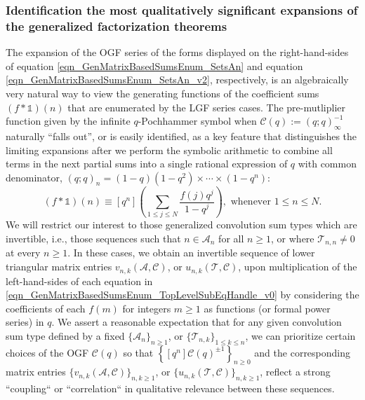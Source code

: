 \documentclass[12pt,reqno,a4letter]{article}
\numberwithin{figure}{section}
\numberwithin{table}{section}
\numberwithin{equation}{section}
\theoremstyle{plain}
\numberwithin{theorem}{section}
\theoremstyle{definition}
\begin{document}
\subsubsection{Identification the most qualitatively significant 
               expansions of the generalized factorization theorems}

The expansion of the OGF series of the forms displayed on the right-hand-sides of 
equation \eqref{eqn_GenMatrixBasedSumsEnum_SetsAn} and 
equation \eqref{eqn_GenMatrixBasedSumsEnum_SetsAn_v2}, respectively, 
is an algebraically very natural way to view the generating functions of the 
coefficient sums $(f \ast \mathds{1})(n)$ that are enumerated by the LGF series cases. 
The pre-mutliplier function given by the infinite $q$-Pochhammer symbol 
when $\mathcal{C}(q) := (q; q)_{\infty}^{-1}$ naturally ``falls out'', 
or is easily identified, as a key feature that distinguishes the limiting expansions 
after we perform the symbolic arithmetic to combine all terms 
in the next partial sums into a single rational expression of $q$ with common denominator, 
$(q; q)_n = (1-q)(1-q^2) \times \cdots \times (1-q^n)$: 
\[
(f \ast \mathds{1})(n) \equiv [q^n] \left(\sum_{1 \leq j \leq N} \frac{f(j) q^j}{1-q^j}\right), 
     \text{ whenever } 1 \leq n \leq N. 
\]
We will restrict our interest to those generalized convolution sum types which are invertible, 
i.e., those sequences such that $n \in \mathcal{A}_n$ for all $n \geq 1$, or where 
$\mathcal{T}_{n,n} \neq 0$ at every $n \geq 1$. 
In these cases, we obtain an invertible sequence of lower triangular matrix entries 
$v_{n,k}(\mathcal{A}, \mathcal{C})$, or $u_{n,k}(\mathcal{T}, \mathcal{C})$, upon 
multiplication of the left-hand-sides of each equation in 
\eqref{eqn_GenMatrixBasedSumsEnum_TopLevelSubEqHandle_v0} by 
considering the coefficients of each 
$f(m)$ for integers $m \geq 1$ as functions (or formal power series) in $q$. 
We assert a reasonable expectation 
that for any given convolution sum type defined by a fixed 
$\{\mathcal{A}_n\}_{n \geq 1}$, or $\{\mathcal{T}_{n,k}\}_{1 \leq k \leq n}$, 
we can prioritize certain choices of the OGF $\mathcal{C}(q)$ so that 
$\left\{[q^n] \mathcal{C}(q)^{\pm 1}\right\}_{n \geq 0}$ and the 
corresponding matrix entries $\{v_{n,k}(\mathcal{A}, \mathcal{C})\}_{n,k \geq 1}$, 
or $\{u_{n,k}(\mathcal{T}, \mathcal{C})\}_{n,k \geq 1}$, reflect a strong 
``coupling`` or ``correlation`` in qualitative relevance between these sequences. 
\end{document}
